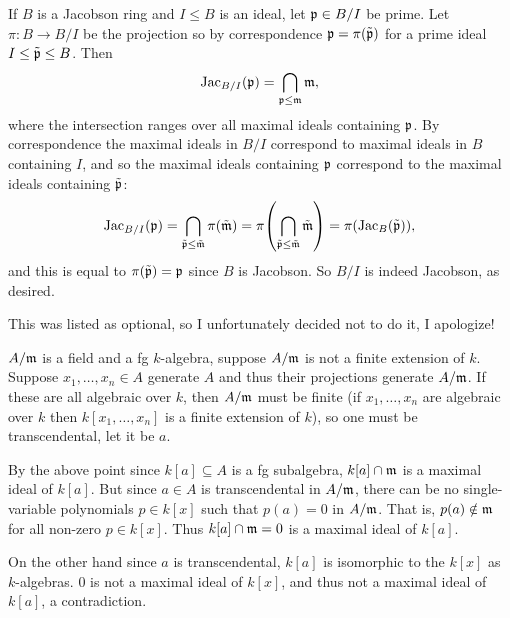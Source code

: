         If $B$ is a Jacobson ring and $I\leq B$ is an ideal, let ${{\frak p}}\in B/I$ be prime.
        Let $\pi\colon B\to B/I$ be the projection so by correspondence ${{\frak p}}=\pi(\tilde{{{\frak p}}})$ for a prime ideal $I\leq\tilde{{{\frak p}}}\leq B$.
        Then
        $$ {\rm Jac}_{B/I}({{\frak p}}) = \bigcap_{{{\frak p}}\leq{{\frak m}}}{{\frak m}} , $$
        where the intersection ranges over all maximal ideals containing ${{\frak p}}$.
        By correspondence the maximal ideals in $B/I$ correspond to maximal ideals in $B$ containing $I$, and so the maximal ideals
        containing ${{\frak p}}$ correspond to the maximal ideals containing $\tilde{{{\frak p}}}$:
        $$ {\rm Jac}_{B/I}({{\frak p}}) = \bigcap_{\tilde{{{\frak p}}}\leq\tilde{{{\frak m}}}}\pi(\tilde{{{\frak m}}}) = \pi\mathopen{}\mathclose{\left(\bigcap_{\tilde{{{\frak p}}}\leq\tilde{{{\frak m}}}}\tilde{{{\frak m}}}\right)}
        = \pi({\rm Jac}_B(\tilde{{{\frak p}}})), $$
        and this is equal to $\pi(\tilde{{{\frak p}}})={{\frak p}}$ since $B$ is Jacobson.
        So $B/I$ is indeed Jacobson, as desired.

        \item This was listed as optional, so I unfortunately decided not to do it, I apologize!

        \item $A/{{\frak m}}$ is a field and a fg $k$-algebra, suppose $A/{{\frak m}}$ is not a finite extension of $k$.
        Suppose $x_1,\dots,x_n\in A$ generate $A$ and thus their projections generate $A/{{\frak m}}$.
        If these are all algebraic over $k$, then $A/{{\frak m}}$ must be finite (if $x_1,\dots,x_n$ are algebraic over $k$ then
        $k[x_1,\dots,x_n]$ is a finite extension of $k$), so one must be transcendental, let it be $a$.

        By the above point since $k[a]\subseteq A$ is a fg subalgebra, $k[a]\cap{{\frak m}}$ is a maximal ideal of $k[a]$.
        But since $a\in A$ is transcendental in $A/{{\frak m}}$, there can be no single-variable polynomials $p\in k[x]$ such that $p(a)=0$ in
        $A/{{\frak m}}$.
        That is, $p(a)\notin{{\frak m}}$ for all non-zero $p\in k[x]$.
        Thus $k[a]\cap{{\frak m}}=0$ is a maximal ideal of $k[a]$.

        On the other hand since $a$ is transcendental, $k[a]$ is isomorphic to the $k[x]$ as $k$-algebras.
        $0$ is not a maximal ideal of $k[x]$, and thus not a maximal ideal of $k[a]$, a contradiction.
    \eenum
\eenum

\bprob

